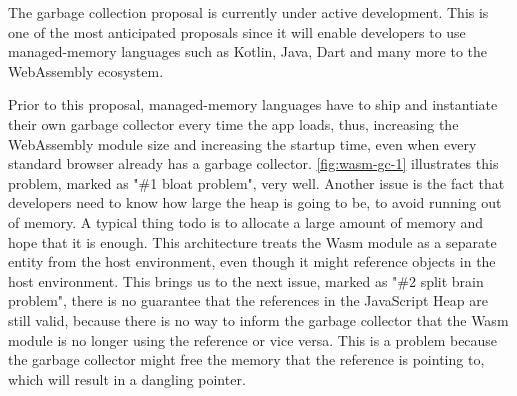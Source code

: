 The garbage collection proposal \cite{webassemblycommunity_2023_gc} is currently under active development. This is one of the most anticipated proposals since it will enable developers to use managed-memory languages such as Kotlin, Java, Dart and many more to the WebAssembly ecosystem. 

Prior to this proposal, managed-memory languages have to ship and instantiate their own garbage collector every time the app loads, thus, increasing the \gls{WebAssembly} module size and increasing the startup time, even when every standard browser already has a garbage collector. \autoref{fig:wasm-gc-1} illustrates this problem, marked as "\#1 bloat problem", very well. Another issue is the fact that developers need to know how large the heap is going to be, to avoid running out of memory. A typical thing todo is to allocate a large amount of memory and hope that it is enough. This architecture treats the Wasm module as a separate entity from the host environment, even though it might reference objects in the host environment. This brings us to the next issue, marked as "\#2 split brain problem", there is no guarantee that the references in the JavaScript Heap are still valid, because there is no way to inform the garbage collector that the Wasm module is no longer using the reference or vice versa. This is a problem because the garbage collector might free the memory that the reference is pointing to, which will result in a dangling pointer. 


